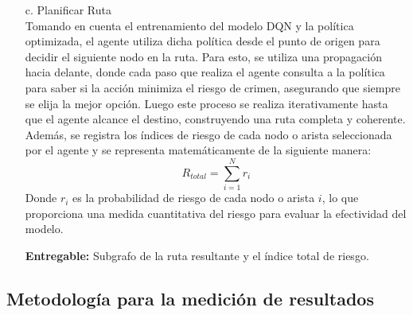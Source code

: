 \begin{itemize}
\begin{itemize}
\end{itemize}
\item[c.] Planificar Ruta \\
Tomando en cuenta el entrenamiento del modelo DQN y la política optimizada, el agente utiliza dicha política desde el punto de origen para decidir el siguiente nodo en la ruta. Para esto, se utiliza una propagación hacia delante, donde cada paso que realiza el agente consulta a la política para saber si la acción minimiza el riesgo de crimen, asegurando que siempre se elija la mejor opción. Luego este proceso se realiza iterativamente hasta que el agente alcance el destino, construyendo una ruta completa y coherente. Además, se registra los índices de riesgo de cada nodo o arista seleccionada por el agente y se representa matemáticamente de la siguiente manera:
\begin{equation} 
	R_{total}=\sum_{i=1}^{N}r_{i}
\end{equation}
Donde $r_{i}$ es la probabilidad de riesgo de cada nodo o arista $i$, lo que proporciona una medida cuantitativa del riesgo para evaluar la efectividad del modelo.

\textbf{Entregable:} Subgrafo de la ruta resultante y el índice total de riesgo.

\end{itemize}

\subsection{Metodología para la medición de resultados}
